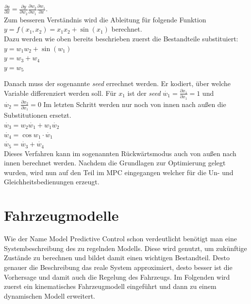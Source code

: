 \documentclass{like}
\begin{document}
$\frac{\partial y}{\partial x} = \frac{\partial y}{\partial w_2} \frac{\partial w_2}{\partial w_1} \frac{\partial w_1}{\partial x}$. \\
Zum besseren Verständnis wird die Ableitung für folgende Funktion
$y = f(x_1, x_2) = x_1x_2 + \sin(x_1)$ berechnet.\\
Dazu werden wie oben bereits beschrieben zuerst die Bestandteile substituiert:\\
$y = w_1w_2 + \sin(w_1) $ \\
$y = w_3 + w_4$ \\
$y = w_5$

Danach muss der sogenannte \textit{seed} errechnet werden. Er kodiert, über welche Variable differenziert werden soll. Für $x_1$ ist der \textit{seed} $\dot{w_1} = \frac{\partial x_1}{\partial x_1} = 1$ und   $\dot{w_2} = \frac{\partial x_2}{\partial x_1} = 0$
Im letzten Schritt werden nur noch von innen nach außen die Substitutionen ersetzt. \\
$\dot{w_3} = w_2\dot{w_1} + w_1 \dot{w_2}$ \\
$\dot{w_4} = \cos{w_1} \cdot \dot{w_1}$ \\
$\dot{w_5} = \dot{w_3} + \dot{w_4}$ \\
Dieses Verfahren kann im sogenannten Rückwärtsmodus auch von außen nach innen berechnet werden. Nachdem die Grundlagen zur Optimierung gelegt wurden, wird nun auf den Teil im \acl{MPC} eingegangen welcher für die Un- und Gleichheitsbedienungen erzeugt. 

\section{Fahrzeugmodelle}

Wie der Name Model Predictive Control schon verdeutlicht benötigt man eine Systembeschreibung des zu regelnden Modells. Diese wird genutzt, um zukünftige Zustände zu berechnen und bildet damit einen wichtigen Bestandteil. Desto genauer die Beschreibung das reale System approximiert, desto besser ist die Vorhersage und damit auch die Regelung des Fahrzeugs.
Im Folgenden wird zuerst ein kinematisches Fahrzeugmodell eingeführt und dann zu einem dynamischen Modell erweitert.   
\end{document}
